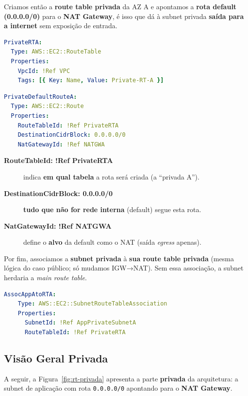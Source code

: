 Criamos então a \textbf{route table privada} da AZ A e apontamos a \textbf{rota default (0.0.0.0/0)} para o \textbf{NAT Gateway}, é isso que dá à subnet privada \textbf{saída para a internet} sem exposição de entrada.

\begin{lstlisting}[language=YAML, float=htbp]
PrivateRTA:
  Type: AWS::EC2::RouteTable
  Properties:
    VpcId: !Ref VPC
    Tags: [{ Key: Name, Value: Private-RT-A }]
\end{lstlisting}

\begin{lstlisting}[language=YAML, float=htbp]
PrivateDefaultRouteA:
  Type: AWS::EC2::Route
  Properties:
    RouteTableId: !Ref PrivateRTA
    DestinationCidrBlock: 0.0.0.0/0
    NatGatewayId: !Ref NATGWA
\end{lstlisting}

\begin{description}
  \item[\textbf{RouteTableId: !Ref PrivateRTA}] indica \textbf{em qual tabela} a rota será criada (a “privada A”).
  \item[\textbf{DestinationCidrBlock: 0.0.0.0/0}] \textbf{tudo que não for rede interna} (default) segue esta rota.
  \item[\textbf{NatGatewayId: !Ref NATGWA}] define o \textbf{alvo} da default como o NAT (saída \emph{egress} apenas).
\end{description}

Por fim, associamos a \textbf{subnet privada} à \textbf{sua route table privada} (mesma lógica do caso público; só mudamos IGW→NAT). Sem essa associação, a subnet herdaria a \textit{main route table}.

\begin{lstlisting}[language=YAML, float=htbp]
AssocAppAtoRTA:
    Type: AWS::EC2::SubnetRouteTableAssociation
    Properties:
      SubnetId: !Ref AppPrivateSubnetA
      RouteTableId: !Ref PrivateRTA
\end{lstlisting}

\subsection{Visão Geral Privada}
A seguir, a Figura~\ref{fig:rt-privada} apresenta a parte \textbf{privada} da arquitetura:
a subnet de aplicação com rota \texttt{0.0.0.0/0} apontando para o \textbf{NAT Gateway}.

